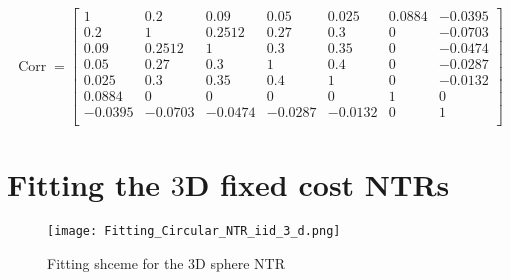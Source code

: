 \documentclass[11pt]{article}
\begin{document}
\begin{appendices}
\[
\operatorname{Corr} =
\begin{bmatrix}
1 & 0.2 & 0.09 & 0.05 & 0.025 & 0.0884 & -0.0395 \\
0.2 & 1 & 0.2512 & 0.27 & 0.3 & 0 & -0.0703 \\
0.09 & 0.2512 & 1 & 0.3 & 0.35 & 0 & -0.0474 \\
0.05 & 0.27 & 0.3 & 1 & 0.4 & 0 & -0.0287 \\
0.025 & 0.3 & 0.35 & 0.4 & 1 & 0 & -0.0132 \\
0.0884 & 0 & 0 & 0 & 0 & 1 & 0 \\
-0.0395 & -0.0703 & -0.0474 & -0.0287 & -0.0132 & 0 & 1 \\
\end{bmatrix}
\]

\section{Fitting the $3$D fixed cost NTRs}\label{section: Fitting_Ellipse_Appendix}
\begin{figure}[!ht]
  \centering
  \texttt{[image: Fitting\_Circular\_NTR\_iid\_3\_d.png]}
  \caption{Fitting shceme for the $3$D sphere NTR}
  \label{fig: Sphere_Fitting_Appendix}
\end{figure}

\end{appendices}
\ifdefined\COMPILINGMAIN
\else
\end{document}
